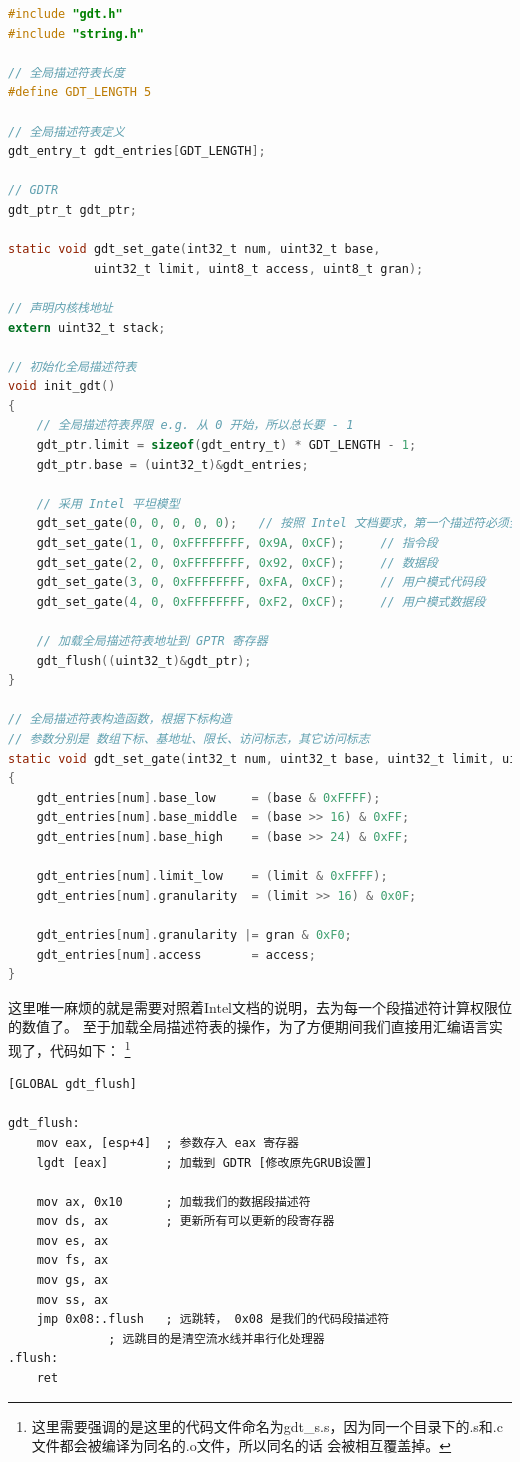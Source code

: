 \begin{lstlisting}[language = C, caption = gdt/gdt.c]
#include "gdt.h"
#include "string.h"

// 全局描述符表长度
#define GDT_LENGTH 5

// 全局描述符表定义
gdt_entry_t gdt_entries[GDT_LENGTH];

// GDTR
gdt_ptr_t gdt_ptr;

static void gdt_set_gate(int32_t num, uint32_t base,
			uint32_t limit, uint8_t access, uint8_t gran);

// 声明内核栈地址
extern uint32_t stack;

// 初始化全局描述符表
void init_gdt()
{
	// 全局描述符表界限 e.g. 从 0 开始，所以总长要 - 1
	gdt_ptr.limit = sizeof(gdt_entry_t) * GDT_LENGTH - 1;
	gdt_ptr.base = (uint32_t)&gdt_entries;

	// 采用 Intel 平坦模型
	gdt_set_gate(0, 0, 0, 0, 0);   // 按照 Intel 文档要求，第一个描述符必须全 0
	gdt_set_gate(1, 0, 0xFFFFFFFF, 0x9A, 0xCF); 	// 指令段
	gdt_set_gate(2, 0, 0xFFFFFFFF, 0x92, 0xCF); 	// 数据段
	gdt_set_gate(3, 0, 0xFFFFFFFF, 0xFA, 0xCF); 	// 用户模式代码段
	gdt_set_gate(4, 0, 0xFFFFFFFF, 0xF2, 0xCF); 	// 用户模式数据段

	// 加载全局描述符表地址到 GPTR 寄存器
	gdt_flush((uint32_t)&gdt_ptr);
}

// 全局描述符表构造函数，根据下标构造
// 参数分别是 数组下标、基地址、限长、访问标志，其它访问标志
static void gdt_set_gate(int32_t num, uint32_t base, uint32_t limit, uint8_t access, uint8_t gran)
{
	gdt_entries[num].base_low     = (base & 0xFFFF);
	gdt_entries[num].base_middle  = (base >> 16) & 0xFF;
	gdt_entries[num].base_high    = (base >> 24) & 0xFF;

	gdt_entries[num].limit_low    = (limit & 0xFFFF);
	gdt_entries[num].granularity  = (limit >> 16) & 0x0F;

	gdt_entries[num].granularity |= gran & 0xF0;
	gdt_entries[num].access       = access;
}

\end{lstlisting}

\par 这里唯一麻烦的就是需要对照着Intel文档的说明，去为每一个段描述符计算权限位的数值了。\allowbreak
至于加载全局描述符表的操作，为了方便期间我们直接用汇编语言实现了，代码如下：\allowbreak
\footnote{这里需要强调的是这里的代码文件命名为gdt\_s.s，因为同一个目录下的.s和.c文件都会被编译为同名的.o文件，所以同名的话\allowbreak
会被相互覆盖掉。}

\begin{lstlisting}[language = {[x86masm]Assembler}, caption = gdt/gdt\_s.s]
[GLOBAL gdt_flush]

gdt_flush:
	mov eax, [esp+4]  ; 参数存入 eax 寄存器
	lgdt [eax]        ; 加载到 GDTR [修改原先GRUB设置]

	mov ax, 0x10      ; 加载我们的数据段描述符
	mov ds, ax        ; 更新所有可以更新的段寄存器
	mov es, ax
	mov fs, ax
	mov gs, ax
	mov ss, ax
	jmp 0x08:.flush   ; 远跳转， 0x08 是我们的代码段描述符
			  ; 远跳目的是清空流水线并串行化处理器
.flush:
	ret
\end{lstlisting}

